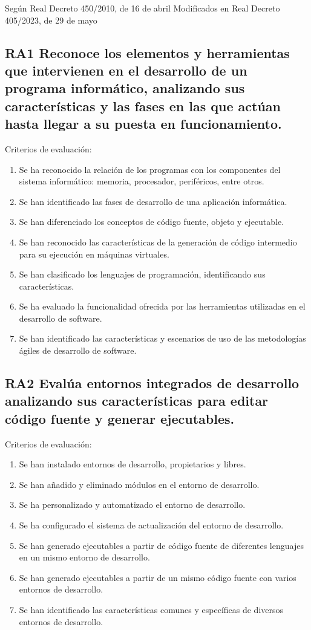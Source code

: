 \documentclass[a4paper]{article}
\begin{document}
Según Real Decreto 450/2010, de 16 de abril
Modificados en Real Decreto 405/2023, de 29 de mayo
\subsection{RA1 Reconoce los elementos y herramientas que intervienen en el desarrollo de un programa informático, analizando sus características y las fases en las que actúan hasta llegar a su puesta en funcionamiento.}
\label{sec:org0000018}
Criterios de evaluación:
\begin{enumerate}
\item Se ha reconocido la relación de los programas con los componentes del sistema informático: memoria, procesador, periféricos, entre otros.
\item Se han identificado las fases de desarrollo de una aplicación informática.
\item Se han diferenciado los conceptos de código fuente, objeto y ejecutable.
\item Se han reconocido las características de la generación de código intermedio para su ejecución en máquinas virtuales.
\item Se han clasificado los lenguajes de programación, identificando sus características.
\item Se ha evaluado la funcionalidad ofrecida por las herramientas utilizadas en el desarrollo de software.
\item Se han identificado las características y escenarios de uso de las metodologías ágiles de desarrollo de software.
\end{enumerate}
\subsection{RA2 Evalúa entornos integrados de desarrollo analizando sus características para editar código fuente y generar ejecutables.}
\label{sec:org000001b}
Criterios de evaluación:
\begin{enumerate}
\item Se han instalado entornos de desarrollo, propietarios y libres.
\item Se han añadido y eliminado módulos en el entorno de desarrollo.
\item Se ha personalizado y automatizado el entorno de desarrollo.
\item Se ha configurado el sistema de actualización del entorno de desarrollo.
\item Se han generado ejecutables a partir de código fuente de diferentes lenguajes en un mismo entorno de desarrollo.
\item Se han generado ejecutables a partir de un mismo código fuente con varios entornos de desarrollo.
\item Se han identificado las características comunes y específicas de diversos entornos de desarrollo.
\end{enumerate}
\end{document}
